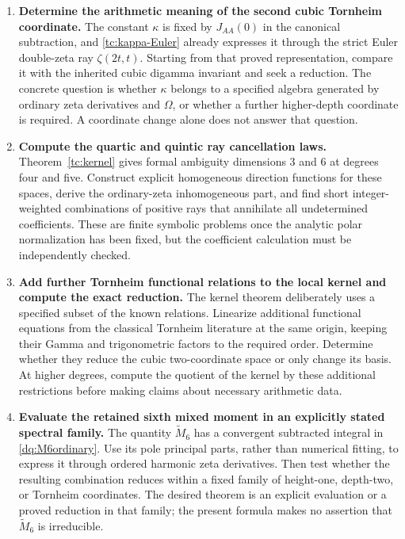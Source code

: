 \documentclass[11pt,a4paper]{article}
\numberwithin{equation}{section}
\theoremstyle{plain}
\theoremstyle{definition}
\theoremstyle{remark}
\begin{document}
\begin{enumerate}[leftmargin=*,label=\textbf{R\arabic*.}]
\item \textbf{Determine the arithmetic meaning of the second cubic
Tornheim coordinate.}
The constant $\kappa$ is fixed by $J_{AA}(0)$ in the canonical
subtraction, and \eqref{tc:kappa-Euler} already expresses it through
the strict Euler double-zeta ray $\zeta(2t,t)$. Starting from that
proved representation, compare it with the inherited cubic digamma
invariant and seek a reduction. The concrete question is whether
$\kappa$ belongs to a specified algebra generated by ordinary zeta
derivatives and $\Omega$, or whether a further higher-depth coordinate
is required. A coordinate change alone does not answer that question.

\item \textbf{Compute the quartic and quintic ray cancellation laws.}
Theorem~\ref{tc:kernel} gives formal ambiguity dimensions $3$ and $6$
at degrees four and five. Construct explicit homogeneous direction
functions for these spaces, derive the ordinary-zeta inhomogeneous part,
and find short integer-weighted combinations of positive rays that
annihilate all undetermined coefficients. These are finite symbolic
problems once the analytic polar normalization has been fixed, but the
coefficient calculation must be independently checked.

\item \textbf{Add further Tornheim functional relations to the local
kernel and compute the exact reduction.}
The kernel theorem deliberately uses a specified subset of the known
relations. Linearize additional functional equations from the classical
Tornheim literature at the same origin, keeping their Gamma and trigonometric
factors to the required order. Determine whether they reduce the cubic
two-coordinate space or only change its basis. At higher degrees, compute
the quotient of the kernel by these additional restrictions before making
claims about necessary arithmetic data.

\item \textbf{Evaluate the retained sixth mixed moment in an explicitly
stated spectral family.}
The quantity $\widetilde M_6$ has a convergent subtracted integral in
\eqref{dq:M6ordinary}. Use its pole principal parts, rather than numerical
fitting, to express it through ordered harmonic zeta derivatives. Then
test whether the resulting combination reduces within a fixed family of
height-one, depth-two, or Tornheim coordinates. The desired theorem is an
explicit evaluation or a proved reduction in that family; the present
formula makes no assertion that $\widetilde M_6$ is irreducible.


\end{enumerate}
\end{document}
